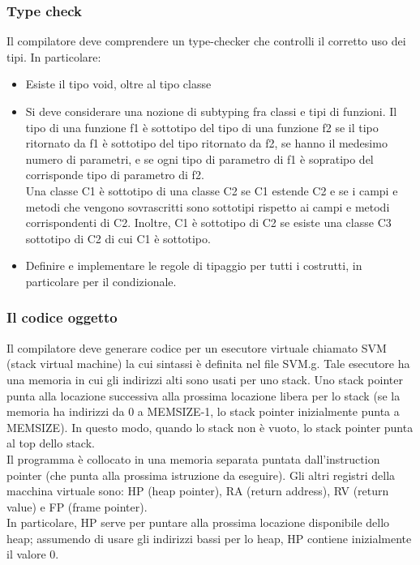 \documentclass[a4paper]{article}   %
\begin{document}
\subsubsection{Type check}

Il compilatore deve comprendere un type-checker che controlli il corretto uso dei tipi.
In particolare:

\begin{itemize}
  \item Esiste il tipo void, oltre al tipo classe

  \item Si deve considerare una nozione di subtyping fra classi e tipi di funzioni. Il tipo
  di una funzione f1 è sottotipo del tipo di una funzione f2 se il tipo ritornato da f1
  è sottotipo del tipo ritornato da f2, se hanno il medesimo numero di parametri, e se
  ogni tipo di parametro di f1 è sopratipo del corrisponde tipo di parametro di f2.\\
  Una classe C1 è sottotipo di una classe C2 se C1 estende C2 e se i campi e metodi che
  vengono sovrascritti sono sottotipi rispetto ai campi e metodi corrispondenti di C2.
  Inoltre, C1 è sottotipo di C2 se esiste una classe C3 sottotipo di C2 di cui C1 è
  sottotipo.

  \item Definire e implementare le regole di tipaggio per tutti i costrutti, in
  particolare per il condizionale.
\end{itemize}

\subsubsection{Il codice oggetto}

Il compilatore deve generare codice per un esecutore virtuale chiamato SVM (stack
virtual machine) la cui sintassi è definita nel file SVM.g. Tale esecutore ha una
memoria in cui gli indirizzi alti sono usati per uno stack. Uno stack pointer punta alla
locazione successiva alla prossima locazione libera per lo stack (se la memoria ha
indirizzi da 0 a MEMSIZE-1, lo stack pointer inizialmente punta a MEMSIZE).
In questo modo, quando lo stack non è vuoto, lo stack pointer punta al top dello stack.\\

Il programma è collocato in una memoria separata puntata dall'instruction pointer
(che punta alla prossima istruzione da eseguire). Gli altri registri della macchina
virtuale sono: HP (heap pointer), RA (return address), RV (return value) e FP
(frame pointer).\\
In particolare, HP serve per puntare alla prossima locazione disponibile dello
heap; assumendo di usare gli indirizzi bassi per lo heap, HP contiene inizialmente
il valore 0.\\
\end{document}
